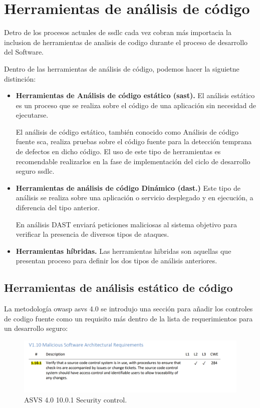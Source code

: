 \newpage
\section{Herramientas de análisis de código}

Detro de los procesos actuales de \gls{ssdlc} cada vez cobran más importacia la inclusion de herramientas de analisis de codigo durante el proceso de desarrollo del Software.

Dentro de las herramientas de análisis de código, podemos hacer la siguietne distinción:

\begin{itemize}
    \item \textbf{Herramientas de Análisis de código estático (\Gls{sast}).} 
    El análisis estático es un proceso que se realiza sobre el código de una aplicación 
    sin necesidad de ejecutarse.

    El  análisis de código estático, también conocido como Análisis de código fuente \Gls{sca}, 
    realiza pruebas sobre el código fuente para la detección temprana de defectos en dicho código. El uso de este
    tipo de herramientas es recomendable realizarlos en la fase de implementación del ciclo
    de desarrollo seguro  \gls{ssdlc}.

    \item \textbf{Herramientas de análisis de código Dinámico (\Gls{dast}.)} 
    Este tipo de análisis se realiza sobre una aplicación o servicio desplegado y en ejecución, a diferencia del tipo anterior.

    En análisis DAST enviará peticiones maliciosas al sistema objetivo para verificar la presencia de diversos tipos de ataques.

        
    \item \textbf{Herramientas híbridas.} 
    Las herramientas hibridas son aquellas que presentan proceso para definir los dos tipos de análisis anteriores.
\end{itemize}
    

\subsection{Herramientas de análisis estático de código}

La metodología  \gls{owasp} \gls{asvs} 4.0 se introdujo una sección para añadir 
los controles de codigo fuente como un requisito más dentro 
de la lista de requerimientos  para un desarrollo seguro:

\begin{figure}[h!]  
    \includegraphics[width=\linewidth]{./imagenes/01_OWASP Application Security Verification Standard 4.0.png}
    \caption{ASVS 4.0 10.0.1 Security control.}  
    \label{fig:ASVS 4.0}
\end{figure}

